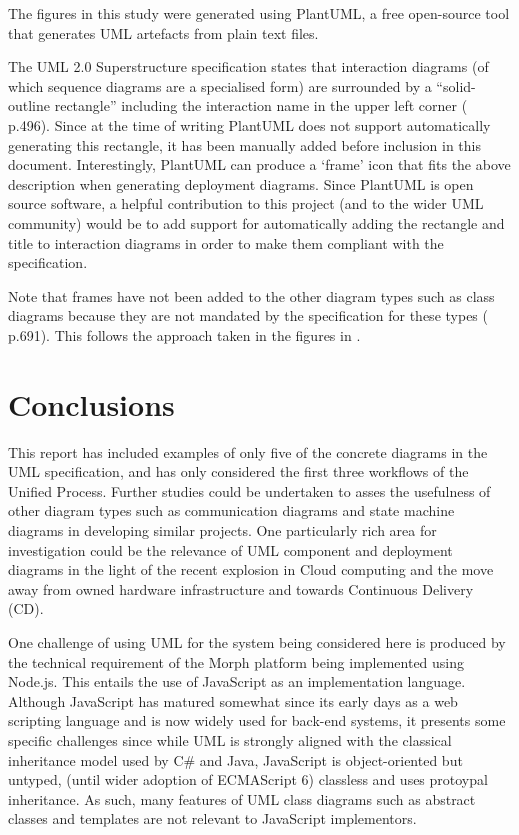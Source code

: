 \documentclass[runningheads,a4paper]{llncs}
\begin{document}
The figures in this study were generated using PlantUML, a free open-source tool\cite{plantuml} that generates UML artefacts from plain text files.

The UML 2.0 Superstructure specification states that interaction diagrams (of which sequence diagrams are a specialised form) are surrounded by a ``solid-outline rectangle'' including the interaction name in the upper left corner (\cite{omg2011} p.496). Since at the time of writing PlantUML does not support automatically generating this rectangle, it has been manually added before inclusion in this document. Interestingly, PlantUML can produce a `frame' icon that fits the above description when generating deployment diagrams. Since PlantUML is open source software, a helpful contribution to this project (and to the wider UML community) would be to add support for automatically adding the rectangle and title to interaction diagrams in order to make them compliant with the specification. 

Note that frames have not been added to the other diagram types such as class diagrams because they are not mandated by the specification for these types (\cite{omg2011} p.691). This follows the approach taken in the figures in \cite{arlow}.


\section{Conclusions}

This report has included examples of only five of the concrete diagrams in the UML specification, and has only considered the first three workflows of the Unified Process. Further studies could be undertaken to asses the usefulness of other diagram types such as communication diagrams and state machine diagrams in developing similar projects. One particularly rich area for investigation could be the relevance of UML component and deployment diagrams in the light of the recent explosion in Cloud computing and the move away from owned hardware infrastructure and towards Continuous Delivery (CD).

One challenge of using UML for the system being considered here is produced by the technical requirement of the Morph platform being implemented using Node.js. This entails the use of JavaScript as an implementation language. Although JavaScript has matured somewhat since its early days as a web scripting language and is now widely used for back-end systems, it presents some specific challenges since while UML is strongly aligned with the classical inheritance model used by C\# and Java, JavaScript is object-oriented but untyped, (until wider adoption of ECMAScript 6) classless and uses protoypal inheritance. As such, many features of UML class diagrams such as abstract classes and templates are not relevant to JavaScript implementors.
\end{document}
